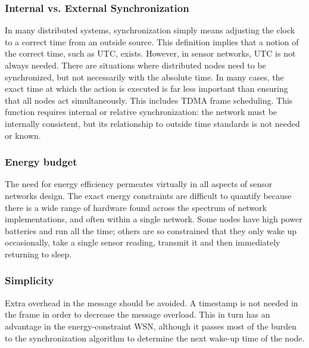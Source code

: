 \documentclass[a4paper,10pt]{report}
\begin{document}
\subsubsection{\textbf{Internal vs. External Synchronization}}
In many distributed systems, synchronization simply means adjusting the clock to a correct time from an outside source. This
definition implies that a notion of the correct time, such as UTC, exists. However, in sensor networks, UTC is not always needed. There are situations where distributed nodes need to be synchronized, but not necessarily with the absolute time.
In many cases, the exact time at which the action is executed is far less important than ensuring that all nodes act simultaneously. This includes TDMA frame scheduling. This function requires internal or relative synchronization: the network must be internally consistent, but its relationship to outside time standards is not needed or known.
\subsubsection{\textbf{Energy budget}} The need for energy efficiency permeates virtually in all aspects of sensor networks design. The exact energy constraints are difficult to quantify because there is a wide range of hardware found across the spectrum of network
implementations, and often within a single network. Some nodes have high power batteries and run all the time; others are so constrained that they only wake up occasionally, take a single sensor reading, transmit it and then immediately returning to sleep.
\subsubsection{\textbf{Simplicity}} Extra overhead in the message should be avoided. A timestamp is not needed in the frame in order to decrease the message overload. This in turn has an advantage in the energy-constraint WSN, although it passes most of the burden to the synchronization algorithm to determine the next wake-up time of the node.
\end{document}
